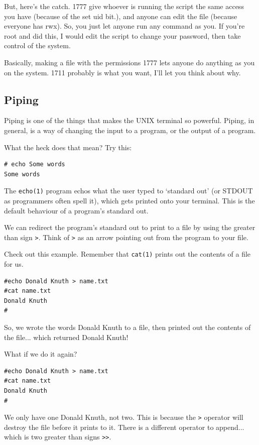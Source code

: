 But, here's the catch.  1777 give whoever is running the script the same access you have (because of the set uid bit.), 
and anyone can edit the file (because everyone has rwx). So, you just let anyone run any command as you. If you're root 
and did this, I would edit the script to change your password, then take control of the system. 

Basically, making a file with the permissions 1777 lets anyone do anything as you on the system. 1711 probably is what you want,
I'll let you think about why.

\subsection {Piping}
Piping is one of the things that makes the UNIX terminal so powerful. Piping,
in general, is a way of changing the input to a program, or the output of a program.

What the heck does that mean? Try this:

\begin{verbatim}
# echo Some words
Some words
\end{verbatim}

The {\tt echo(1)} program echos what the user typed to `standard out' (or STDOUT as 
programmers often spell it), which 
gets printed onto your terminal. This is the default behaviour of a program's standard
out.
	
We can redirect the program's standard out to print to a file by using the greater
than sign {\tt >}. Think of {\tt >} as an arrow pointing out from the program to your file.

Check out this example. Remember that {\tt cat(1)} prints out the contents of a file for us.

\begin{verbatim}
#echo Donald Knuth > name.txt
#cat name.txt 
Donald Knuth
#
\end{verbatim}

So, we wrote the words Donald Knuth to a file, then printed out the contents of the
file... which returned Donald Knuth!

What if we do it again?
\begin{verbatim}
#echo Donald Knuth > name.txt
#cat name.txt 
Donald Knuth
#
\end{verbatim}

We only have one Donald Knuth, not two. This is because the {\tt >}	operator
will destroy the file before it prints to it. There is a different operator
to append... which is two greater than signs {\tt >>}.

